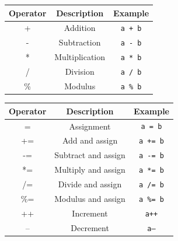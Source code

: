 \documentclass[a4paper, 10pt]{article}
\begin{document}
\begin{minipage}{0.45\textwidth}
    \centering
    \begin{tabular}{|c|c|c|}
        \hline
        Operator & Description    & Example         \\
        \hline
        +        & Addition       & \texttt{a + b}  \\
        \hline
        -        & Subtraction    & \texttt{a - b}  \\
        \hline
        *        & Multiplication & \texttt{a * b}  \\
        \hline
        /        & Division       & \texttt{a / b}  \\
        \hline
        \%       & Modulus        & \texttt{a \% b} \\
        \hline
    \end{tabular}
\end{minipage}
\hfill
\begin{minipage}{0.50\textwidth}
    \centering
    \begin{tabular}{|c|c|c|}
        \hline
        Operator & Description         & Example          \\
        \hline
        =        & Assignment          & \texttt{a = b}   \\
        \hline
        +=       & Add and assign      & \texttt{a += b}  \\
        \hline
        -=       & Subtract and assign & \texttt{a -= b}  \\
        \hline
        *=       & Multiply and assign & \texttt{a *= b}  \\
        \hline
        /=       & Divide and assign   & \texttt{a /= b}  \\
        \hline
        \%=      & Modulus and assign  & \texttt{a \%= b} \\
        \hline
        ++       & Increment           & \texttt{a++}     \\
        \hline
        --       & Decrement           & \texttt{a--}     \\
        \hline
    \end{tabular}
\end{minipage}
\end{document}
